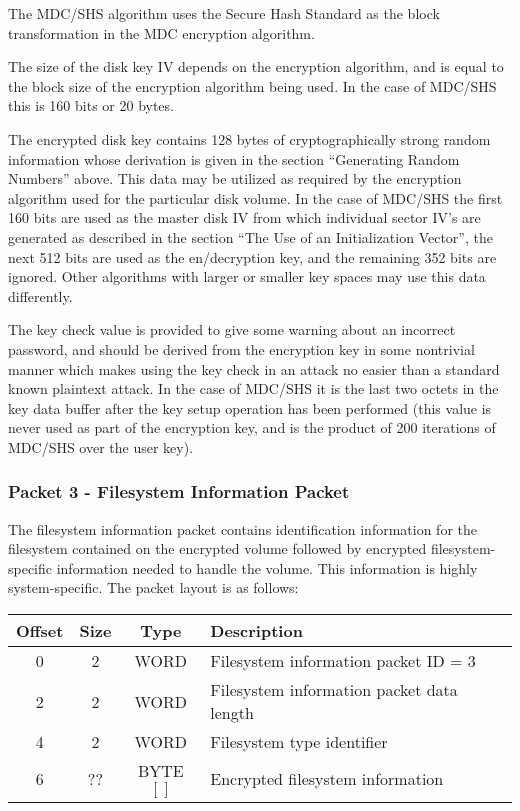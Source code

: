 The MDC/SHS algorithm uses the Secure Hash Standard as the block transformation
in the MDC encryption algorithm.

The size of the disk key IV depends on the encryption algorithm, and is equal
to the block size of the encryption algorithm being used.  In the case of
MDC/SHS this is 160 bits or 20 bytes.

The encrypted disk key contains 128 bytes of cryptographically strong random
information whose derivation is given in the section ``Generating Random
Numbers'' above.  This data may be utilized as required by the encryption
algorithm used for the particular disk volume.  In the case of MDC/SHS the
first 160 bits are used as the master disk IV from which individual sector IV's
are generated as described in the section ``The Use of an Initialization
Vector'', the next 512 bits are used as the en/decryption key, and the remaining
352 bits are ignored.  Other algorithms with larger or smaller key spaces may
use this data differently.

The key check value is provided to give some warning about an incorrect
password, and should be derived from the encryption key in some nontrivial
manner which makes using the key check in an attack no easier than a standard
known plaintext attack.  In the case of MDC/SHS it is the last two octets in
the key data buffer after the key setup operation has been performed (this
value is never used as part of the encryption key, and is the product of 200
iterations of MDC/SHS over the user key).


\subsubsection{Packet 3 - Filesystem Information Packet}

The filesystem information packet contains identification information for the
filesystem contained on the encrypted volume followed by encrypted
filesystem-specific information needed to handle the volume.  This information
is highly system-specific.  The packet layout is as follows:

\begin{center}
\begin{tabular}{|c|c|c|l|}
\hline
    Offset & Size  &  Type   &     Description\\
\hline
       0   &   2   &  WORD   &     Filesystem information packet ID = 3\\
       2   &   2   &  WORD   &     Filesystem information packet data length\\
       4   &   2   &  WORD   &     Filesystem type identifier\\
       6   &  ??   &  BYTE$[ ]$ &     Encrypted filesystem information\\
\hline
\end{tabular}
\end{center}

